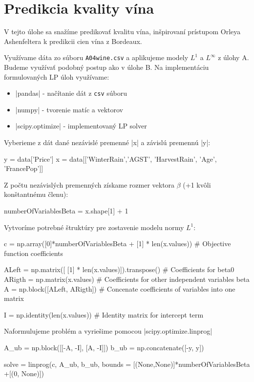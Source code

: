 \documentclass[report.tex]{subfiles}
\begin{document}
   

\section{Predikcia kvality vína}\label{sec:C}
V tejto úlohe sa snažíme predikovať kvalitu vína, inšpirovaní prístupom Orleya Ashenfeltera k predikcii cien vína z Bordeaux.

Využívame dáta zo súboru \verb|A04wine.csv| a aplikujeme modely $L^1$ a $L^{\infty}$ z úlohy A. Budeme využívať podobný postup ako v úlohe B. Na implementáciu formulovaných LP úloh využívame:
\begin{itemize}
	\item \pyth|pandas| - načítanie dát z \verb|csv| súboru
	\item \pyth|numpy| - tvorenie matíc a vektorov
	\item \pyth|scipy.optimize| - implementovaný LP solver
\end{itemize}

Vyberieme z dát dané nezávislé premenné \pyth|x| a závislú premennú \pyth|y|:

\begin{python}
y = data['Price']
x = data[['WinterRain','AGST', 'HarvestRain', 'Age', 'FrancePop']]
\end{python}

Z počtu nezávislých premenných získame rozmer vektora $\beta$ (+1 kvôli konštantnému členu):

\begin{python}
numberOfVariablesBeta = x.shape[1] + 1
\end{python}

Vytvoríme potrebné štruktúry pre zostavenie modelu normy $L^1$:

\begin{python}
c = np.array([0]*numberOfVariablesBeta + [1] * len(x.values)) # Objective function coefficients

ALeft = np.matrix([ [1] * len(x.values)]).transpose() # Coefficients for beta0
ARigth = np.matrix(x.values) # Coefficients for other independent variables beta
A = np.block([ALeft, ARigth]) # Concenate coefficients of variables into one matrix

I = np.identity(len(x.values)) # Identity matrix for intercept term
\end{python}

Naformulujeme problém a vyriešime pomocou \pyth|scipy.optimize.linprog|

\begin{python}
A_ub = np.block([[-A, -I], [A, -I]])
b_ub = np.concatenate([-y, y])

solve = linprog(c, A_ub, b_ub, bounds = [(None,None)]*numberOfVariablesBeta +[(0, None)])
\end{python}
\end{document}

